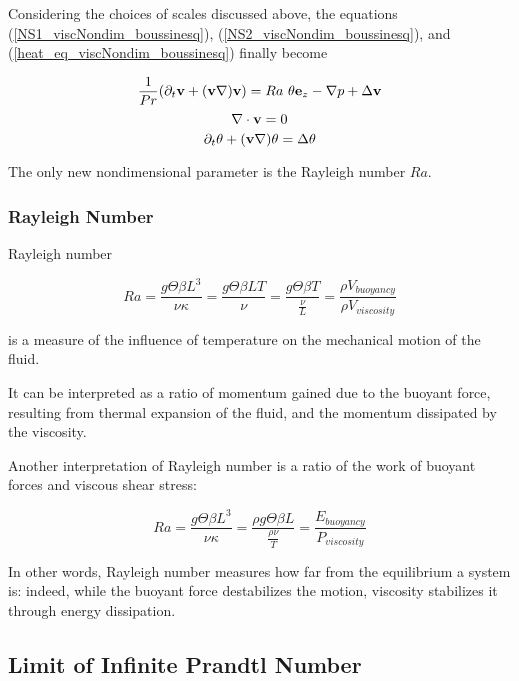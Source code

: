 Considering the choices of scales discussed above, the equations (\ref{NS1_viscNondim_boussinesq}), (\ref{NS2_viscNondim_boussinesq}), and (\ref{heat_eq_viscNondim_boussinesq}) finally become

\begin{equation} \label{NS1_viscNondim_boussinesq_time}
\frac{1}{Pr} (\partial_t\mathbf{v} + (\mathbf{v}\nabla)\mathbf{v}) = Ra ~\theta \mathbf{e}_z - \nabla p + \Delta\mathbf{v} 
\end{equation}
\begin{equation} \label{NS2_viscNondim_boussinesq_time}
\nabla\cdot \mathbf{v} = 0
\end{equation}
\begin{equation} \label{heat_eq_viscNondim_boussinesq_time}
\partial_t\theta + (\mathbf{v}\nabla)\theta = \Delta\theta  
\end{equation} 

The only new nondimensional parameter is the Rayleigh number $Ra$.

\subsubsection{Rayleigh Number}

Rayleigh number 

$$ Ra = \frac{g\Theta \beta L^3}{\nu\kappa} = \frac{g\Theta \beta L T}{\nu} = \frac{g\Theta \beta T}{\frac{\nu}{L}} = \frac{\rho V_{buoyancy}}{\rho V_{viscosity}} $$

is a measure of the influence of temperature on the mechanical motion of the fluid. 

It can be interpreted as a ratio of momentum gained due to the buoyant force, resulting from thermal expansion of the fluid, and the momentum dissipated by the viscosity. 

Another interpretation of Rayleigh number is a ratio of the work of buoyant forces and viscous shear stress:

$$ Ra = \frac{g\Theta \beta L^3}{\nu\kappa} = \frac{\rho g\Theta \beta L}{\frac{\rho \nu}{T}} = \frac{E_{buoyancy}}{P_{viscosity}} $$

In other words, Rayleigh number measures how far from the equilibrium a system is: indeed, while the buoyant force destabilizes the motion, viscosity stabilizes it through energy dissipation.

\subsection{Limit of Infinite Prandtl Number}

